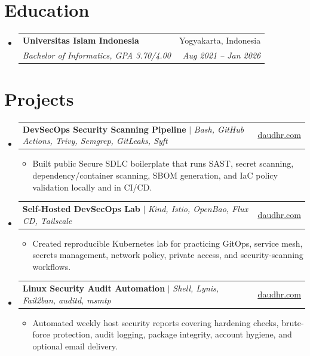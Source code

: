 \documentclass[letterpaper,11pt]{article}
\makeatletter
\newcommand{\resumeItem}[1]{
  \item\small{
    {#1 \vspace{-2pt}}
  }
}
\newcommand{\resumeSubheading}[4]{
  \vspace{-2pt}\item
    \begin{tabular*}{0.97\textwidth}[t]{l@{\extracolsep{\fill}}r}
      \textbf{#1} & #2 \\
      \textit{\small#3} & \textit{\small #4} \\
    \end{tabular*}\vspace{-7pt}
}
\newcommand{\resumeProjectHeading}[2]{
    \item
    \begin{tabular*}{0.97\textwidth}{l@{\extracolsep{\fill}}r}
      \small#1 & #2 \\
    \end{tabular*}\vspace{-7pt}
}
\newcommand{\resumeSubHeadingListStart}{\begin{itemize}[leftmargin=0.15in, label={}]}
\newcommand{\resumeSubHeadingListEnd}{\end{itemize}}
\newcommand{\resumeItemListStart}{\begin{itemize}}
\newcommand{\resumeItemListEnd}{\end{itemize}\vspace{-5pt}}
\makeatother
\begin{document}
\section{Education}
  \resumeSubHeadingListStart
    \resumeSubheading
      {Universitas Islam Indonesia}{Yogyakarta, Indonesia}
      {Bachelor of Informatics, GPA 3.70/4.00}{Aug 2021 -- Jan 2026}
  \resumeSubHeadingListEnd

\section{Projects}
    \resumeSubHeadingListStart
      \resumeProjectHeading
          {\textbf{DevSecOps Security Scanning Pipeline} $|$ \emph{Bash, GitHub Actions, Trivy, Semgrep, GitLeaks, Syft}}{\href{https://daudhr.com/projects/devsecops-security-scanning-pipeline}{\underline{daudhr.com}}}
          \resumeItemListStart
            \resumeItem{Built public Secure SDLC boilerplate that runs SAST, secret scanning, dependency/container scanning, SBOM generation, and IaC policy validation locally and in CI/CD.}
          \resumeItemListEnd
      \resumeProjectHeading
          {\textbf{Self-Hosted DevSecOps Lab} $|$ \emph{Kind, Istio, OpenBao, Flux CD, Tailscale}}{\href{https://daudhr.com/projects/self-hosted-devsecops-lab}{\underline{daudhr.com}}}
          \resumeItemListStart
            \resumeItem{Created reproducible Kubernetes lab for practicing GitOps, service mesh, secrets management, network policy, private access, and security-scanning workflows.}
          \resumeItemListEnd
      \resumeProjectHeading
          {\textbf{Linux Security Audit Automation} $|$ \emph{Shell, Lynis, Fail2ban, auditd, msmtp}}{\href{https://daudhr.com/projects/linux-security-audit-automation}{\underline{daudhr.com}}}
          \resumeItemListStart
            \resumeItem{Automated weekly host security reports covering hardening checks, brute-force protection, audit logging, package integrity, account hygiene, and optional email delivery.}
          \resumeItemListEnd
    \resumeSubHeadingListEnd
\end{document}

